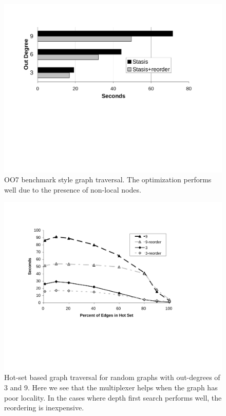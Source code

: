 \documentclass[letterpaper,twocolumn,10pt]{article}
\begin{document}
\begin{figure}[t]
\includegraphics[width=1\columnwidth]{figs/oo7.pdf}
\vspace{-15pt}
\caption{\sf\label{fig:oo7} OO7 benchmark style graph traversal.  The optimization performs well due to the presence of non-local nodes.}
\end{figure}

\begin{figure}[t]
\includegraphics[width=1\columnwidth]{figs/trans-closure-hotset.pdf}
\vspace{-12pt}
\caption{\sf\label{fig:hotGraph} Hot-set based graph traversal for random graphs with out-degrees of 3 and 9.  Here
we see that the multiplexer helps when the graph has poor locality.
In the cases where depth first search performs well, the
reordering is inexpensive.}
\end{figure}
\end{document}
